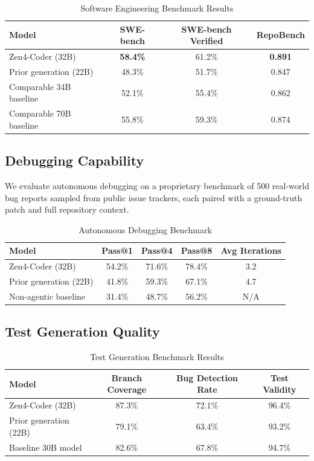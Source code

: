 \documentclass[11pt,a4paper]{article}
\begin{document}
\begin{table}[H]
\centering
\caption{Software Engineering Benchmark Results}
\begin{tabular}{lccc}
\toprule
\textbf{Model} & \textbf{SWE-bench} & \textbf{SWE-bench Verified} & \textbf{RepoBench} \\
\midrule
Zen4-Coder (32B) & \textbf{58.4\%} & 61.2\% & \textbf{0.891} \\
Prior generation (22B) & 48.3\% & 51.7\% & 0.847 \\
Comparable 34B baseline & 52.1\% & 55.4\% & 0.862 \\
Comparable 70B baseline & 55.8\% & 59.3\% & 0.874 \\
\bottomrule
\end{tabular}
\end{table}

\subsection{Debugging Capability}

We evaluate autonomous debugging on a proprietary benchmark of 500 real-world bug reports sampled from public issue trackers, each paired with a ground-truth patch and full repository context.

\begin{table}[H]
\centering
\caption{Autonomous Debugging Benchmark}
\begin{tabular}{lcccc}
\toprule
\textbf{Model} & \textbf{Pass@1} & \textbf{Pass@4} & \textbf{Pass@8} & \textbf{Avg Iterations} \\
\midrule
Zen4-Coder (32B) & 54.2\% & 71.6\% & 78.4\% & 3.2 \\
Prior generation (22B) & 41.8\% & 59.3\% & 67.1\% & 4.7 \\
Non-agentic baseline & 31.4\% & 48.7\% & 56.2\% & N/A \\
\bottomrule
\end{tabular}
\end{table}

\subsection{Test Generation Quality}

\begin{table}[H]
\centering
\caption{Test Generation Benchmark Results}
\begin{tabular}{lccc}
\toprule
\textbf{Model} & \textbf{Branch Coverage} & \textbf{Bug Detection Rate} & \textbf{Test Validity} \\
\midrule
Zen4-Coder (32B) & 87.3\% & 72.1\% & 96.4\% \\
Prior generation (22B) & 79.1\% & 63.4\% & 93.2\% \\
Baseline 30B model & 82.6\% & 67.8\% & 94.7\% \\
\bottomrule
\end{tabular}
\end{table}
\end{document}
